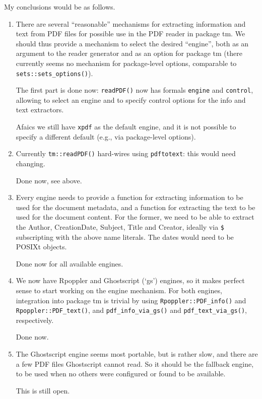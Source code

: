 \documentclass[a4paper]{article}
\newcommand{\strong}[1]{{\normalfont\fontseries{b}\selectfont #1}}
\let\pkg=\strong
\begin{document}
My conclusions would be as follows.
\begin{enumerate}
 \item There are several ``reasonable'' mechanisms for extracting
  information and text from PDF files for possible use in the PDF reader
  in package \pkg{tm}.  We should thus provide a mechanism to select the
  desired ``engine'', both as an argument to the reader generator and as
  an option for package \pkg{tm} (there currently seems no mechanism for
  package-level options, comparable to \verb|sets::sets_options()|).

  The first part is done now: \verb|readPDF()| now has formals
  \verb|engine| and \verb|control|, allowing to select an engine and to
  specify control options for the info and text extractors.

  Afaics we still have \verb|xpdf| as the default engine, and it is not
  possible to specify a different default (e.g., via package-level
  options).

 \item Currently \verb|tm::readPDF()| hard-wires using \verb|pdftotext|:
  this would need changing.

  Done now, see above.

 \item Every engine needs to provide a function for extracting
  information to be used for the document metadata, and a function for
  extracting the text to be used for the document content.  For the
  former, we need to be able to extract the Author, CreationDate,
  Subject, Title and Creator, ideally via \verb|$| subscripting with the
  above name literals.  The dates would need to be POSIXt objects.

  Done now for all available engines.

 \item We now have Rpoppler and Ghostscript (`gs') engines, so it makes
  perfect sense to start working on the engine mechanism.  For both
  engines, integration into package \pkg{tm} is trivial by using
  \verb|Rpoppler::PDF_info()| and \verb|Rpoppler::PDF_text()|, and
  \verb|pdf_info_via_gs()| and \verb|pdf_text_via_gs()|, respectively.

  Done now.

 \item The Ghostscript engine seems most portable, but is rather slow,
  and there are a few PDF files Ghostscript cannot read.  So it should
  be the fallback engine, to be used when no others were configured or
  found to be available.

  This is still open.
\end{enumerate}
\end{document}
